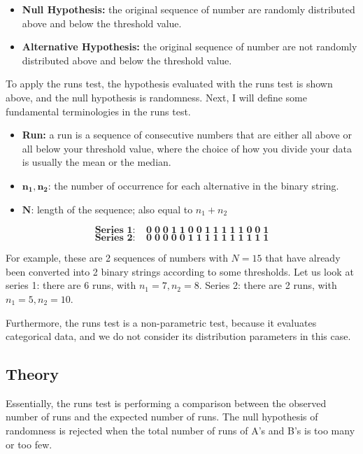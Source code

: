 \documentclass[12pt]{article}
\theoremstyle{plain}
\theoremstyle{definition}
\theoremstyle{remark}
\begin{document}
\begin{itemize}
    \item \textbf{Null Hypothesis:} the original sequence of number are randomly distributed above and below the threshold value.
    \item \textbf{Alternative Hypothesis:} the original sequence of number are not randomly distributed above and below the threshold value.
\end{itemize}

To apply the runs test, the hypothesis evaluated with the runs test is shown above, and the null hypothesis is randomness. Next, I will define some fundamental terminologies in the runs test.

\begin{itemize}
    \item \textbf{Run:} a run is a sequence of consecutive numbers that are either all above or all below your threshold value, where the choice of how you divide your data is usually the mean or the median. 
    \item $\mathbf{n_1},\mathbf{n_2}$: the number of occurrence for each alternative in the binary string.
    \item $\mathbf N$: length of the sequence; also equal to $n_1+n_2$
\end{itemize}

\[\mathbf{\textbf{Series 1:}\;\;\;\;0\;0\;0\;1\;1\;0\;0\;1\;1\;1\;1\;1\;0\;0\;1}\]
\[\mathbf{\textbf{Series 2:}\;\;\;\;0\;0\;0\;0\;0\;1\;1\;1\;1\;1\;1\;1\;1\;1\;1}\]

For example, these are 2 sequences of numbers with $N=15$ that have already been converted into 2 binary strings according to some thresholds. Let us look at series 1: there are 6 runs, with $n_1=7,n_2=8$. Series 2: there are 2 runs, with $n_1=5,n_2=10$.

Furthermore, the runs test is a non-parametric test, because it evaluates categorical data, and we do not consider its distribution parameters in this case.

\newpage
\subsection{Theory}
Essentially, the runs test is performing a comparison between the observed number of runs and the expected number of runs. The null hypothesis of randomness is rejected when the total number of runs of A’s and B’s is too many or too few. 
\end{document}
